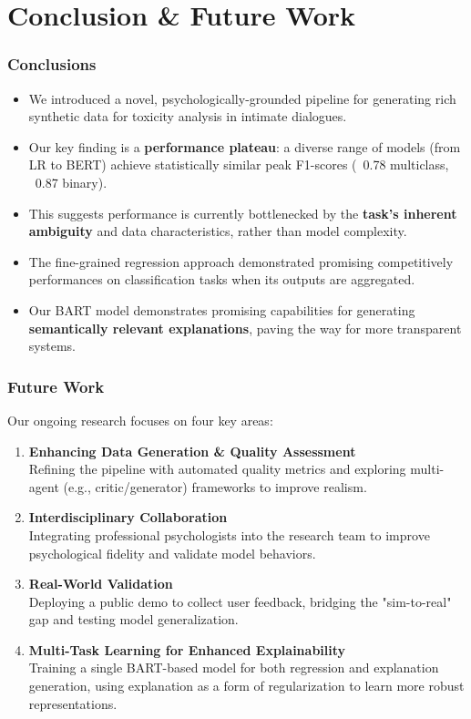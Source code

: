 \documentclass[aspectratio=169]{beamer}
\begin{document}
\section{Conclusion \& Future Work}

\begin{frame}
  \frametitle{Conclusions}
  
  \begin{itemize}
    \item We introduced a novel, psychologically-grounded pipeline for generating rich synthetic data for toxicity analysis in intimate dialogues.
    \pause
    \item Our key finding is a \textbf{performance plateau}: a diverse range of models (from LR to BERT) achieve statistically similar peak F1-scores (~0.78 multiclass, ~0.87 binary).
    \pause
    \item This suggests performance is currently bottlenecked by the \textbf{task's inherent ambiguity} and data characteristics, rather than model complexity.
    \pause
    \item The fine-grained regression approach demonstrated promising competitively performances on classification tasks when its outputs are aggregated.
    \pause
    \item Our BART model demonstrates promising capabilities for generating \textbf{semantically relevant explanations}, paving the way for more transparent systems.
  \end{itemize}
\end{frame}

\begin{frame}
  \frametitle{Future Work}
  
  Our ongoing research focuses on four key areas:
  
  \begin{enumerate}
    \item \textbf{Enhancing Data Generation \& Quality Assessment} \\
    Refining the pipeline with automated quality metrics and exploring multi-agent (e.g., critic/generator) frameworks to improve realism.

    \item \textbf{Interdisciplinary Collaboration} \\
    Integrating professional psychologists into the research team to improve psychological fidelity and validate model behaviors.
    
    \item \textbf{Real-World Validation} \\
    Deploying a public demo to collect user feedback, bridging the "sim-to-real" gap and testing model generalization.
    
    \item \textbf{Multi-Task Learning for Enhanced Explainability} \\
    Training a single BART-based model for both regression and explanation generation, using explanation as a form of regularization to learn more robust representations.
  \end{enumerate}
\end{frame}
\end{document}
